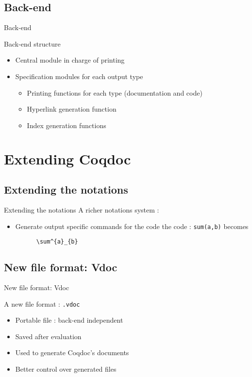\documentclass[compress]{beamer}
\newenvironment{tframe}[1]{
  \subsection{#1}
  \begin{frame}{#1}
  }{
  \end{frame}
  }
\begin{document}
  \begin{tframe}{Back-end}
    Back-end structure
    \begin{itemize}
      \item Central module in charge of printing
      \item Specification modules for each output type
        \begin{itemize}
          \item Printing functions for each type (documentation and code)
          \item Hyperlink generation function
          \item Index generation functions
        \end{itemize}
    \end{itemize}
  \end{tframe}

\section{Extending Coqdoc}
\subsection{Extending the notations}
\begin{frame}[containsverbatim]{Extending the notations}
  A richer notations system :
  \begin{itemize}
    \item Generate output specific commands for the code
      the code : \texttt{sum(a,b)} becomes
      \begin{verbatim}
      \sum^{a}_{b}
      \end{verbatim}
  \end{itemize}
\end{frame}
\begin{tframe}{New file format: Vdoc}
  A new file format : \texttt{.vdoc}
  \begin{itemize}
    \item Portable file : back-end independent
    \item Saved after evaluation
    \item Used to generate Coqdoc's documents
    \item Better control over generated files
  \end{itemize}
\end{tframe}
\end{document}
